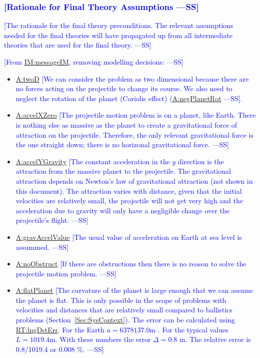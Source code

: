 \documentclass[12pt]{article}
\newcommand{\authornote}[3]{\textcolor{#1}{[#3 ---#2]}}
\newcommand{\authornote}[3]{}
\newcommand{\wss}[1]{\authornote{blue}{SS}{#1}}
\begin{document}
\subsubsection{\wss{Rationale for Final Theory Assumptions}} \label{Sec:FTRationale}

\wss{The rationale for the final theory preconditions.  The relevant assumptions needed for the final theories will have propagated up from all intermediate theories that are used for the final theory.}

\wss{From \hyperref[IM:messageIM]{IM:messageIM}, removing modelling decisions:}

\begin{itemize}
\item \hyperref[twoD]{A:twoD} \wss{We can consider the problem as two dimensional because there are no forces acting on the projectile to change its course. We also need to neglect the rotation of the planet (Coriolis effect) (\hyperref[negPlanetRot]{A:negPlanetRot}}.
\item \hyperref[accelXZero]{A:accelXZero} \wss{The projectile motion problem is
on a planet, like Earth.  There is nothing else as massive as the planet to
create a gravitational force of attraction on the projectile.  Therefore, the
only relevant gravitational force is the one straight down; there is no
horizonal gravitational force.}
\item \hyperref[accelYGravity]{A:accelYGravity} \wss{The constant acceleration
in the $y$ direction is the attraction from the massive planet to the
projectile. The gravitational attraction depends on Newton's law of
gravitational attraction (not shown in this document).  The attraction varies
with distance, given that the initial velocities are relatively small, the
projectile will not get very high and the acceleration due to gravity will only
have a negligible change over the projectile's flight.}
\item \hyperref[gravAccelValue]{A:gravAccelValue} \wss{The usual value of acceleration on Earth at sea level is assummed.}
\item \hyperref[noObstruct]{A:noObstruct} \wss{If there are obstructions then there is no reason to solve the projectile motion problem.}
\item \hyperref[flatPlanet]{A:flatPlanet} \wss{The curvature of the planet is large enough that we can assume the planet is flat.  This is only possible in the scope of problems with velocities and distances that are relatively small compared to ballistics problems (Section~\ref{Sec:SysContext}). The error can be calculated using \hyperref[RT:lngDstErr]{RT:lngDstErr}.  For the Earth $a = 6 378 137.0 \text{m}$ \cite{Crouse2014}.  For the typical values $L = 1019.4 \text{m}$.  With these numbers the error $\Delta = 0.8$ m.  The relative error is 0.8/1019.4 or 0.008 \%.}
\end{itemize}
\end{document}
